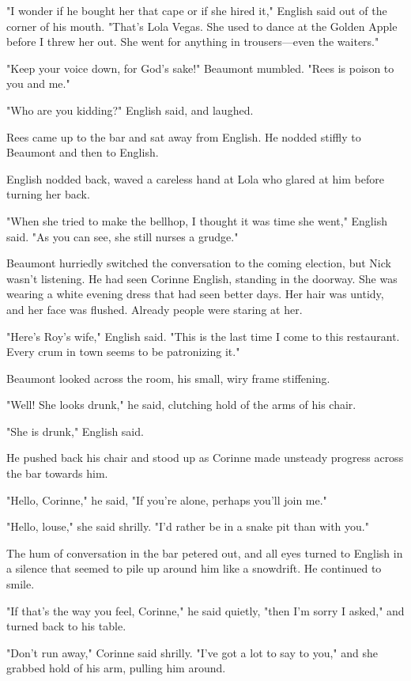 \documentclass{novel}
\begin{document}
"I wonder if he bought her that cape or if she hired it," English said out of the corner of his mouth. "That's Lola Vegas. She used to dance at the Golden Apple before I threw her out. She went for anything in trousers—even the waiters."

"Keep your voice down, for God's sake!" Beaumont mumbled. "Rees is poison to you and me."

"Who are you kidding?" English said, and laughed.

Rees came up to the bar and sat away from English. He nodded stiffly to Beaumont and then to English.

English nodded back, waved a careless hand at Lola who glared at him before turning her back.

"When she tried to make the bellhop, I thought it was time she went," English said. "As you can see, she still nurses a grudge."

Beaumont hurriedly switched the conversation to the coming election, but Nick wasn't listening. He had seen Corinne English, standing in the doorway. She was wearing a white evening dress that had seen better days. Her hair was untidy, and her face was flushed. Already people were staring at her.

"Here's Roy's wife," English said. "This is the last time I come to this restaurant. Every crum in town seems to be patronizing it."

Beaumont looked across the room, his small, wiry frame stiffening.

"Well! She looks drunk," he said, clutching hold of the arms of his chair.

"She is drunk," English said.

He pushed back his chair and stood up as Corinne made unsteady progress across the bar towards him.

"Hello, Corinne," he said, "If you're alone, perhaps you'll join me."

"Hello, louse," she said shrilly. "I'd rather be in a snake pit than with you."

The hum of conversation in the bar petered out, and all eyes turned to English in a silence that seemed to pile up around him like a snowdrift. He continued to smile.

"If that's the way you feel, Corinne," he said quietly, "then I'm sorry I asked," and turned back to his table.

"Don't run away," Corinne said shrilly. "I've got a lot to say to you," and she grabbed hold of his arm, pulling him around.
\end{document}
